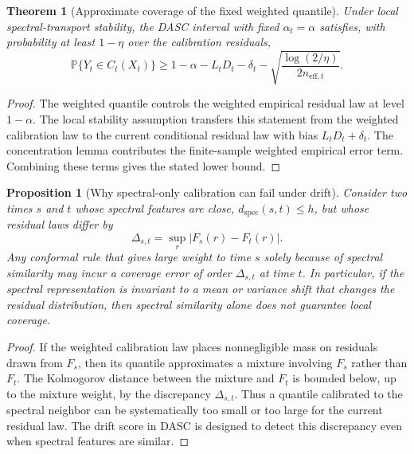 \documentclass[11pt]{article}
\newtheorem{theorem}{Theorem}
\newtheorem{proposition}{Proposition}
\begin{document}
\begin{theorem}[Approximate coverage of the fixed weighted quantile]
Under local spectral-transport stability, the DASC interval with fixed $\alpha_t=\alpha$ satisfies, with probability at least $1-\eta$ over the calibration residuals,
\[
    \mathbb{P}\{Y_t\in C_t(X_t)\}
    \geq
    1-\alpha
    -
    L_tD_t
    -
    \delta_t
    -
    \sqrt{\frac{\log(2/\eta)}{2n_{\mathrm{eff},t}}}.
\]
\end{theorem}

\begin{proof}
The weighted quantile controls the weighted empirical residual law at level $1-\alpha$. The local stability assumption transfers this statement from the weighted calibration law to the current conditional residual law with bias $L_tD_t+\delta_t$. The concentration lemma contributes the finite-sample weighted empirical error term. Combining these terms gives the stated lower bound.
\end{proof}

\begin{proposition}[Why spectral-only calibration can fail under drift]
Consider two times $s$ and $t$ whose spectral features are close, $d_{\mathrm{spec}}(s,t)\leq h$, but whose residual laws differ by
\[
    \Delta_{s,t}=\sup_r |F_s(r)-F_t(r)|.
\]
Any conformal rule that gives large weight to time $s$ solely because of spectral similarity may incur a coverage error of order $\Delta_{s,t}$ at time $t$. In particular, if the spectral representation is invariant to a mean or variance shift that changes the residual distribution, then spectral similarity alone does not guarantee local coverage.
\end{proposition}

\begin{proof}
If the weighted calibration law places nonnegligible mass on residuals drawn from $F_s$, then its quantile approximates a mixture involving $F_s$ rather than $F_t$. The Kolmogorov distance between the mixture and $F_t$ is bounded below, up to the mixture weight, by the discrepancy $\Delta_{s,t}$. Thus a quantile calibrated to the spectral neighbor can be systematically too small or too large for the current residual law. The drift score in DASC is designed to detect this discrepancy even when spectral features are similar.
\end{proof}
\end{document}

